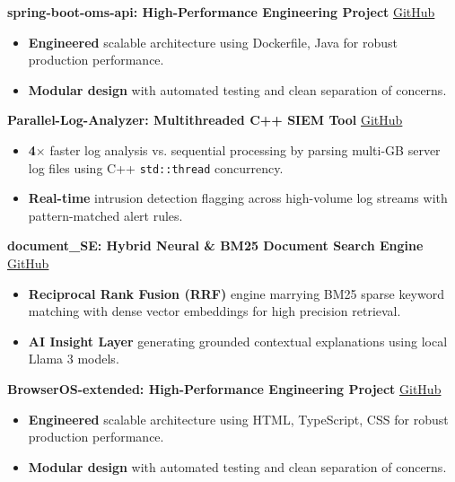 
\noindent \textbf{spring-boot-oms-api: High-Performance Engineering Project} \hfill \href{https://github.com/jimitchavdadev/spring-boot-oms-api}{GitHub}\par
\begin{itemize}
  \item \textbf{Engineered} scalable architecture using Dockerfile, Java for robust production performance.
  \item \textbf{Modular design} with automated testing and clean separation of concerns.
\end{itemize}

\vspace{2pt}
\noindent \textbf{Parallel-Log-Analyzer: Multithreaded C++ SIEM Tool} \hfill \href{https://github.com/jimitchavdadev/Parallel-Log-Analyzer}{GitHub}\par
\begin{itemize}
  \item \textbf{4$\times$} faster log analysis vs. sequential processing by parsing multi-GB server log files using C++ \texttt{std::thread} concurrency.
  \item \textbf{Real-time} intrusion detection flagging across high-volume log streams with pattern-matched alert rules.
\end{itemize}

\vspace{2pt}
\noindent \textbf{document\_SE: Hybrid Neural \& BM25 Document Search Engine} \hfill \href{https://github.com/jimitchavdadev/document_SE}{GitHub}\par
\begin{itemize}
  \item \textbf{Reciprocal Rank Fusion (RRF)} engine marrying BM25 sparse keyword matching with dense vector embeddings for high precision retrieval.
  \item \textbf{AI Insight Layer} generating grounded contextual explanations using local Llama 3 models.
\end{itemize}

\vspace{2pt}
\noindent \textbf{BrowserOS-extended: High-Performance Engineering Project} \hfill \href{https://github.com/jimitchavdadev/BrowserOS-extended}{GitHub}\par
\begin{itemize}
  \item \textbf{Engineered} scalable architecture using HTML, TypeScript, CSS for robust production performance.
  \item \textbf{Modular design} with automated testing and clean separation of concerns.
\end{itemize}
